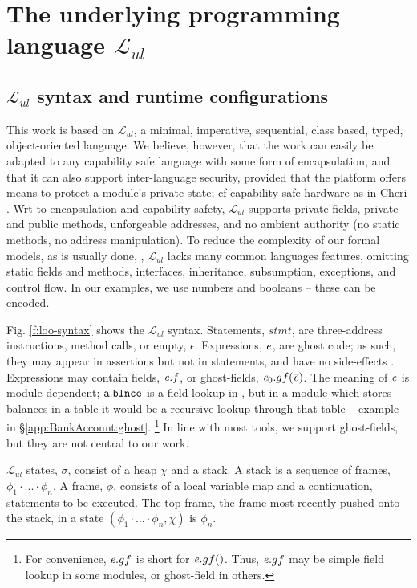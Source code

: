 \renewcommand{\LangOO}{\ensuremath{{\mathcal{L}}_{ul}}\xspace }

\section{The underlying programming language \LangOO}  
\label{sect:underlying}

\subsection{\LangOO syntax and runtime configurations}
\label{sub:Loo} 
This work is based on \LangOO, a {minimal}, imperative, sequential,  class based, typed, object-oriented language. 
We believe, however, that the work can easily be adapted to any capability safe language with some form of encapsulation,
and that it can also support inter-language security, provided that the 
platform offers means to protect a module’s private state; cf capability-safe hardware as in Cheri \cite{davis2019cheriabi}.
Wrt to encapsulation and  capability safety,  \LangOO supports private fields, private and public methods, unforgeable addresses, and no ambient authority (no static methods, no address manipulation).
To reduce the complexity of our formal models, as is usually done, \eg \cite{IgaPieWadTOPLAS01,DietlDrossopoulouMueller07a,ParBiePOPL05},  \LangOO lacks many common languages features, omitting static fields and methods, interfaces,
inheritance, subsumption, exceptions, and control flow.  
{In our examples, we use numbers and booleans -- these can be encoded.}
 
Fig. \ref{f:loo-syntax} shows the   \LangOO syntax. {Statements, $stmt$, are three-address instructions,   method calls, or empty, $\epsilon$.}  
Expressions, $\mathit{e}$, are ghost code;  as such, they may appear in assertions but not in statements, and have no side-effects \cite{ghost,ghost:spirit}.
Expressions  may contain fields, $\mathit{e}.f$, or ghost-fields, ${\mathit{e}_0.gf(\overline {\mathit{e}})}$.
The meaning of $\mathit{e}$ is module-dependent; \eg$\mbox{\normalfont{\texttt{a}}}.\mbox{\normalfont{\texttt{\mbox{\normalfont{\texttt{blnce}}}}}}$   is a field lookup  in \ModA , but in a module which stores balances in a table it would be a recursive lookup through that table  -- \cf example   in \S \ref{app:BankAccount:ghost}. 
  \footnote
{For convenience,   $\mathit{e}.gf$ is short for $\mathit{e}.gf()$. Thus,  $\mathit{e}.gf$ may be simple field lookup  in some modules, or  ghost-field  in others. }
In line with most tools, we support ghost-fields, but they are not central to our work.
 

\LangOO states, $\sigma$,  consist of a  heap $\chi$ and a stack. 
{A stack  is a sequence of frames, $\phi_1\!\cdot\!...\!\cdot\! \phi_n$.}
A  frame, $\phi$, consists of a local variable map and a continuation,   
statements to be executed.
The top frame, \ie  the frame most recently pushed onto the stack,  in a state $(\phi_1\!\cdot\!...\!\cdot\! \phi_n, \chi)$ is $\phi_n$.



